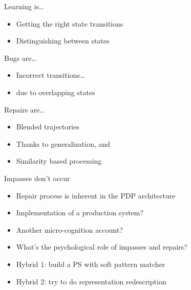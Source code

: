 \begin{slide*}


\noindent Learning is\ldots
\begin{itemize}
\item Getting the right state transitions
\item Distinguishing between states
\end{itemize}

\noindent Bugs are\ldots
\begin{itemize}
\item Incorrect transitions\ldots
\item due to overlapping states
\end{itemize}

\noindent Repairs are\ldots
\begin{itemize}
\item Blended trajectories
\item Thanks to generalization, and
\item Similarity based processing
\end{itemize}

\medskip
Impasses don't occur

\end{slide*}



\begin{slide*}

\bigskip

\begin{itemize}
\item Repair process is inherent in the PDP architecture
\item Implementation of a production system?
\item Another micro-cognition account?
\item What's the psychological role of impasses and repairs?
\item Hybrid 1: build a PS with soft pattern matcher
\item Hybrid 2: try to do representation redescription
\end{itemize}

\end{slide*}



